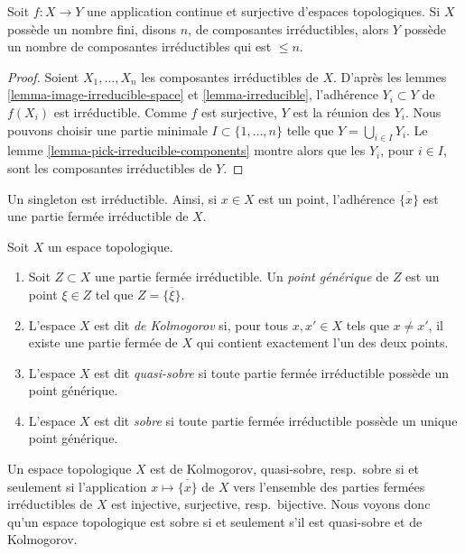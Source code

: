 \begin{lemma}
\label{lemma-surjective-continuous-irreducible-components}
Soit $f : X \to Y$ une application continue et surjective d'espaces
topologiques. Si $X$ possède un nombre fini, disons $n$, de composantes
irréductibles, alors $Y$ possède un nombre de composantes irréductibles qui
est $\leq n$.
\end{lemma}

\begin{proof}
Soient $X_1, \ldots, X_n$ les composantes irréductibles de $X$.
D'après les lemmes \ref{lemma-image-irreducible-space} et
\ref{lemma-irreducible}, l'adhérence $Y_i \subset Y$ de $f(X_i)$ est
irréductible. Comme $f$ est surjective, $Y$ est la réunion des $Y_i$.
Nous pouvons choisir une partie minimale $I \subset \{1, \ldots, n\}$ telle
que $Y = \bigcup_{i \in I} Y_i$. Le lemme
\ref{lemma-pick-irreducible-components} montre alors que les $Y_i$, pour
$i \in I$, sont les composantes irréductibles de $Y$.
\end{proof}

\noindent
Un singleton est irréductible. Ainsi, si $x \in X$ est un point, l'adhérence
$\overline{\{x\}}$ est une partie fermée irréductible de $X$.

\begin{definition}
\label{definition-generic-point}
Soit $X$ un espace topologique.
\begin{enumerate}
\item Soit $Z \subset X$ une partie fermée irréductible. Un
{\it point générique} de $Z$ est un point $\xi \in Z$ tel que
$Z = \overline{\{\xi\}}$.
\item L'espace $X$ est dit {\it de Kolmogorov} si, pour tous
$x, x' \in X$ tels que $x \not = x'$, il existe une partie fermée de $X$ qui
contient exactement l'un des deux points.
\item L'espace $X$ est dit {\it quasi-sobre} si toute partie fermée
irréductible possède un point générique.
\item L'espace $X$ est dit {\it sobre} si toute partie fermée irréductible
possède un unique point générique.
\end{enumerate}
\end{definition}

\noindent
Un espace topologique $X$ est de Kolmogorov, quasi-sobre, resp.\ sobre si et
seulement si l'application $x\mapsto\overline{\{x\}}$ de $X$ vers l'ensemble
des parties fermées irréductibles de $X$ est injective, surjective, resp.\
bijective. Nous voyons donc qu'un espace topologique est sobre si et seulement
s'il est quasi-sobre et de Kolmogorov.


